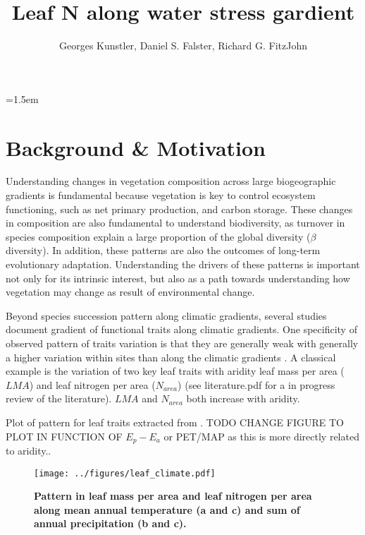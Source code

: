 \documentclass[a4paper,11pt]{article}
\title{Leaf N along water stress gardient}
\author{Georges Kunstler, Daniel S. Falster, Richard G. FitzJohn}
\date{}
\affiliation{Irstea Grenoble France}
\affiliation{Department of Biological Sciences, Macquarie University,
  Sydney, Australia}
\begin{document}
\mstitleshort
\parindent=1.5em
\addtolength{\parskip}{.3em}


\section{Background \& Motivation}

Understanding changes in vegetation composition across large biogeographic gradients is fundamental because vegetation is key to control ecosystem functioning, such as net primary production, and carbon storage. These changes in composition are also fundamental to understand biodiversity, as turnover in species composition explain a large proportion of the global diversity ($\beta$ diversity). In addition, these patterns are also the outcomes of long-term evolutionary adaptation. Understanding the drivers of these patterns is important not only for its intrinsic interest, but also as a path towards understanding how vegetation may change as result of environmental change.

Beyond species succession pattern along climatic gradients, several studies document gradient of functional traits along climatic gradients. One specificity of observed pattern of traits variation is that they are generally weak with generally a higher variation within sites than along the climatic gradients \citep[see][]{Wright-2004}. A classical example is the variation of two key leaf traits with aridity leaf mass per area ($LMA$) and leaf nitrogen per area ($N_{area}$) (see literature.pdf for a in progress review of the literature). $LMA$ \citep{Wright-2004,Onoda-2011,Moles-2014} and $N_{area}$ \citep{Wright-2005,Maire-2015} both increase with aridity. 

\clearpage


Plot of pattern for leaf traits extracted from \citep{Wright-2004}.
TODO CHANGE FIGURE TO PLOT IN FUNCTION OF $E_p - E_a$ or PET/MAP as this is more directly related to aridity..

\begin{figure}[ht]
\centering
\texttt{[image: ../figures/leaf\_climate.pdf]}
\caption{\textbf{Pattern in leaf mass per area and leaf nitrogen per area along mean annual temperature (a and c) and sum of annual precipitation (b and c).}%
\label{fig:leafpattern}}
\end{figure}
\end{document}
